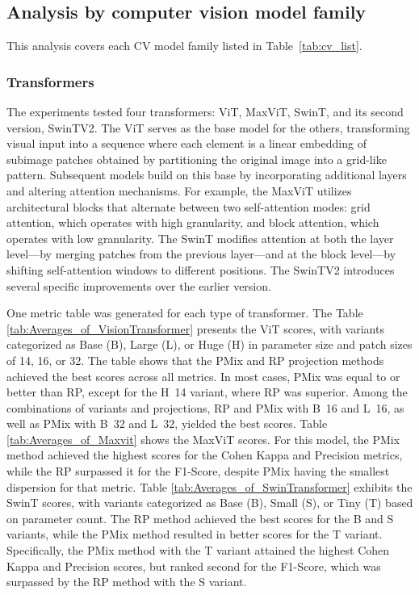 \subsection{Analysis by computer vision model family}
 
This analysis covers each \gls{CV} model family listed in Table~\ref{tab:cv_list}.
 
\subsubsection{Transformers}

The experiments tested four transformers: \gls{ViT}, \gls{MaxViT}, \gls{SwinT}, and its second version, \gls{SwinTV2}. The \gls{ViT} serves as the base model for the others, transforming visual input into a sequence where each element is a linear embedding of subimage patches obtained by partitioning the original image into a grid-like pattern. Subsequent models build on this base by incorporating additional layers and altering attention mechanisms. For example, the \gls{MaxViT} utilizes architectural blocks that alternate between two self-attention modes: grid attention, which operates with high granularity, and block attention, which operates with low granularity. The \gls{SwinT} modifies attention at both the layer level—by merging patches from the previous layer—and at the block level—by shifting self-attention windows to different positions. The \gls{SwinTV2} introduces several specific improvements over the earlier version.


One metric table was generated for each type of transformer.
The Table \ref{tab:Averages_of_VisionTransformer} presents the \gls{ViT} scores, with variants categorized as Base (B), Large (L), or Huge (H) in parameter size and patch sizes of 14, 16, or 32. The table shows that the \gls{PMix} and \gls{RP} projection methods achieved the best scores across all metrics. In most cases, \gls{PMix} was equal to or better than \gls{RP}, except for the \mbox{H 14} variant, where \gls{RP} was superior. Among the combinations of variants and projections, \gls{RP} and \gls{PMix} with \mbox{B 16} and \mbox{L 16}, as well as \gls{PMix} with \mbox{B 32} and \mbox{L 32}, yielded the best scores.
Table \ref{tab:Averages_of_Maxvit} shows the \gls{MaxViT} scores.  For this model, the \gls{PMix} method achieved the highest scores for the Cohen Kappa and Precision metrics, while the \gls{RP} surpassed it for the F1-Score, despite \gls{PMix} having the smallest dispersion for that metric.
Table \ref{tab:Averages_of_SwinTransformer} exhibits the \gls{SwinT} scores, with variants categorized as Base (B), Small (S), or Tiny (T) based on parameter count. The \gls{RP} method achieved the best scores for the B and S variants, while the \gls{PMix} method resulted in better scores for the T variant. Specifically, the \gls{PMix} method with the T variant attained the highest Cohen Kappa and Precision scores, but ranked second for the F1-Score, which was surpassed by the \gls{RP} method with the S variant.


